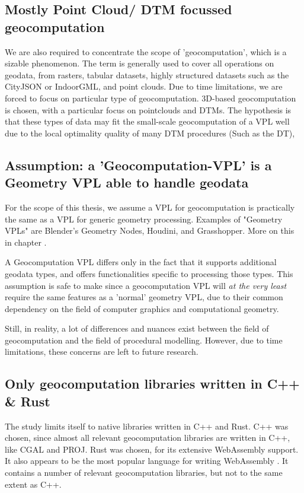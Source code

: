 \subsection*{Mostly Point Cloud/ DTM focussed geocomputation}

We are also required to concentrate the scope of 'geocomputation', which is a sizable phenomenon.
The term is generally used to cover all operations on geodata, from rasters, tabular datasets, highly structured datasets such as the CityJSON or IndoorGML, and point clouds. 
Due to time limitations, we are forced to focus on particular type of geocomputation.
3D-based geocomputation is chosen, with a particular focus on pointclouds and DTMs. 
The hypothesis is that these types of data may fit the small-scale geocomputation of a VPL well due to the local optimality quality of many DTM procedures (Such as the \ac{DT}), 

\subsection*{Assumption: a 'Geocomputation-VPL' is a Geometry VPL able to handle geodata}
For the scope of this thesis, we assume a VPL for geocomputation is practically the same as a VPL for generic geometry processing.
Examples of "Geometry VPLs" are Blender's Geometry Nodes, Houdini, and Grasshopper.
More on this in chapter .

A Geocomputation VPL differs only in the fact that it supports additional geodata types, and offers functionalities specific to processing those types.  
This assumption is safe to make since a geocomputation VPL will \emph{at the very least} require the same features as a 'normal' geometry VPL, due to their common dependency on the field of computer graphics and computational geometry.

Still, in reality, a lot of differences and nuances exist between the field of geocomputation and the field of procedural modelling. 
However, due to time limitations, these concerns are left to future research.
 
\subsection*{Only geocomputation libraries written in C++ \& Rust}
The study limits itself to native libraries written in C++ and Rust. 
C++ was chosen, since almost all relevant geocomputation libraries are written in C++, like CGAL and PROJ. 
Rust was chosen, for its extensive WebAssembly support. 
It also appears to be the most popular language for writing WebAssembly \citep{eberhardt_state_2022}.
It contains a number of relevant geocomputation libraries, but not to the same extent as C++.

